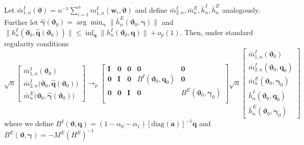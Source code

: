 \begin{lem}
  Let $\bar{m}^I_{1,n}(\boldsymbol{\vartheta}) = n^{-1}\sum_{i=1}^n m_{1,n}^I(\mathbf{w}_i,\boldsymbol{\vartheta})$ and define $\bar{m}_{2,n}^I, \bar{m}_n^E, \bar{h}_n^I,\bar{h}_n^E$ analogously.
  Further let $\widehat{\boldsymbol{\gamma}}(\boldsymbol{\vartheta}_0) = \arg \min_{\boldsymbol{\gamma}} \lVert \bar{h}_n^E(\boldsymbol{\vartheta}_0, \boldsymbol{\gamma}) \rVert$ and 
    $\lVert h_n^I(\boldsymbol{\vartheta}_0, \widehat{\mathbf{q}}(\boldsymbol{\vartheta}_0))\rVert \leq \inf_{\mathbf{q}} \lVert h_n^I(\boldsymbol{\vartheta}_0, \mathbf{q})\rVert + o_p(1)$.
Then, under standard regularity conditions
  \[
    \sqrt{n}\left[
    \begin{array}{l}
      \bar{m}_{1,n}^I\left( \boldsymbol{\vartheta}_0 \right)\\
      \bar{m}_{2,n}^I\big( \boldsymbol{\vartheta}_0, \widehat{\mathbf{q}}(\boldsymbol{\vartheta}_0)\big)\\
      \bar{m}_{n}^E\big( \boldsymbol{\vartheta}_0, \widehat{\boldsymbol{\gamma}}(\boldsymbol{\vartheta}_0) \big)
    \end{array}
  \right] \rightarrow_p 
  \left[
  \begin{array}{ccccc}
    \mathbf{I}&\mathbf{0}&\mathbf{0} & \mathbf{0} & \mathbf{0} \\
    \mathbf{0}&\mathbf{I}&\mathbf{0} & B^I( \boldsymbol{\vartheta}_0, \boldsymbol{q}_0)& \mathbf{0} \\
    \mathbf{0}&\mathbf{0}&\mathbf{I} &\mathbf{0} & B^E(\boldsymbol{\vartheta}_0,\boldsymbol{\gamma}_0)\\
  \end{array}
\right] 
    \sqrt{n}\left[
    \begin{array}{l}
      \bar{m}_{1,n}^I\left( \boldsymbol{\vartheta}_0 \right)\\
      \bar{m}_{2,n}^I\left(\boldsymbol{\vartheta}_0,  \mathbf{q}_0\right)\\
      \bar{m}_n^E\left(\boldsymbol{\vartheta}_0, \boldsymbol{\gamma}_0  \right)\\
      \bar{h}^I_n\left(\boldsymbol{\vartheta}_0,  \mathbf{q}_0 \right)\\
      \bar{h}^E_n\left(\boldsymbol{\vartheta}_0,  \boldsymbol{\gamma}_0 \right)
    \end{array}
  \right] 
  \]
  where we define $B^I( \boldsymbol{\vartheta}, \boldsymbol{q}) = (1 - \alpha_0 - \alpha_1) \left[\mbox{diag}(\mathbf{a})  \right]^{-1} \mathbf{q}$ and
$B^E(\boldsymbol{\vartheta},\boldsymbol{\gamma}) = -M^E (H^E)^{-1}$

\end{lem}
